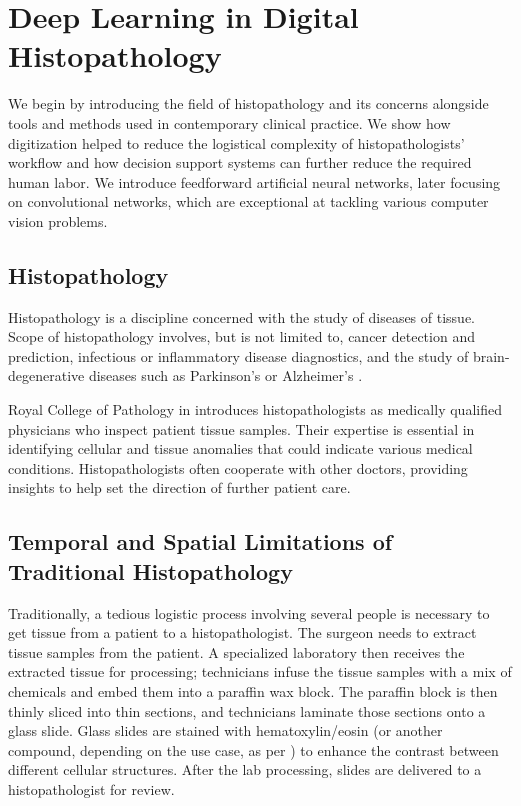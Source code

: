 \chapter{Deep Learning in Digital Histopathology}

We begin by introducing the field of histopathology and its concerns alongside tools and methods used in contemporary clinical practice.
We show how digitization helped to reduce the logistical complexity of histopathologists' workflow and how decision support systems can further reduce the required human labor.
We introduce feedforward artificial neural networks, later focusing on convolutional networks, which are exceptional at tackling various computer vision problems.

\section{Histopathology}

Histopathology is a discipline concerned with the study of diseases of tissue.
Scope of histopathology involves, but is not limited to, cancer detection and prediction, infectious or inflammatory disease diagnostics, and the study of brain-degenerative diseases such as Parkinson's or Alzheimer's \cite{histopathology-cancer, histopathology-infectious, histopathology-inflammatory, histopathology-brain-degenerative}.

Royal College of Pathology in \cite{histopathologist-role} introduces histopathologists as medically qualified physicians who inspect patient tissue samples.
Their expertise is essential in identifying cellular and tissue anomalies that could indicate various medical conditions.
Histopathologists often cooperate with other doctors, providing insights to help set the direction of further patient care.

\section{Temporal and Spatial Limitations of Traditional Histopathology}

Traditionally, a tedious logistic process involving several people is necessary to get tissue from a patient to a histopathologist.
The surgeon needs to extract tissue samples from the patient.
A specialized laboratory then receives the extracted tissue for processing; technicians infuse the tissue samples with a mix of chemicals and embed them into a paraffin wax block.
The paraffin block is then thinly sliced into thin sections, and technicians laminate those sections onto a glass slide.
Glass slides are stained with hematoxylin/eosin (or another compound, depending on the use case, as per \cite{histopathology-staining}) to enhance the contrast between different cellular structures.
After the lab processing, slides are delivered to a histopathologist for review.

